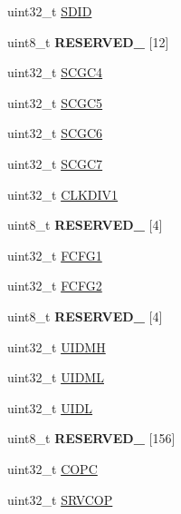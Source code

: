 \begin{DoxyCompactItemize}
\item 
uint32\+\_\+t \hyperlink{struct_s_i_m___mem_map_a05732d81c464fe278244a2027960ddc1}{S\+D\+I\+D}
\item 
\hypertarget{struct_s_i_m___mem_map_a8c752b26764b7d15368cf85fe57a34b9}{}uint8\+\_\+t {\bfseries R\+E\+S\+E\+R\+V\+E\+D\+\_} \mbox{[}12\mbox{]}\label{struct_s_i_m___mem_map_a8c752b26764b7d15368cf85fe57a34b9}

\item 
uint32\+\_\+t \hyperlink{struct_s_i_m___mem_map_a10c826c9197f80b94fa050a36943e871}{S\+C\+G\+C4}
\item 
uint32\+\_\+t \hyperlink{struct_s_i_m___mem_map_ae622490033273b25b5ba0e17600368cd}{S\+C\+G\+C5}
\item 
uint32\+\_\+t \hyperlink{struct_s_i_m___mem_map_aee7123ada2dcba294b1f26615f2cc689}{S\+C\+G\+C6}
\item 
uint32\+\_\+t \hyperlink{struct_s_i_m___mem_map_ab3ec649af457836a31a78fa8d2c4388a}{S\+C\+G\+C7}
\item 
uint32\+\_\+t \hyperlink{struct_s_i_m___mem_map_ae56d33007aecc902d1394c2adca212af}{C\+L\+K\+D\+I\+V1}
\item 
\hypertarget{struct_s_i_m___mem_map_ab95a859ed80f2b72b5538bcc1806d924}{}uint8\+\_\+t {\bfseries R\+E\+S\+E\+R\+V\+E\+D\+\_} \mbox{[}4\mbox{]}\label{struct_s_i_m___mem_map_ab95a859ed80f2b72b5538bcc1806d924}

\item 
uint32\+\_\+t \hyperlink{struct_s_i_m___mem_map_ab2a9ce086973740fcd958ea83a6967f2}{F\+C\+F\+G1}
\item 
uint32\+\_\+t \hyperlink{struct_s_i_m___mem_map_a548bbc722cef80f7bc9624f1309964c1}{F\+C\+F\+G2}
\item 
\hypertarget{struct_s_i_m___mem_map_a4e4f1fbee587e08a2b02ff956746fb74}{}uint8\+\_\+t {\bfseries R\+E\+S\+E\+R\+V\+E\+D\+\_} \mbox{[}4\mbox{]}\label{struct_s_i_m___mem_map_a4e4f1fbee587e08a2b02ff956746fb74}

\item 
uint32\+\_\+t \hyperlink{struct_s_i_m___mem_map_a599672d7e15a6f7a2b774a3b06e0e9cc}{U\+I\+D\+M\+H}
\item 
uint32\+\_\+t \hyperlink{struct_s_i_m___mem_map_ac0ca2251290fdadcaf84fbe3a7534b6d}{U\+I\+D\+M\+L}
\item 
uint32\+\_\+t \hyperlink{struct_s_i_m___mem_map_a339fceb110e65a719f4566c52270be8e}{U\+I\+D\+L}
\item 
\hypertarget{struct_s_i_m___mem_map_a2139860497710bc375266dc42d96ee6c}{}uint8\+\_\+t {\bfseries R\+E\+S\+E\+R\+V\+E\+D\+\_} \mbox{[}156\mbox{]}\label{struct_s_i_m___mem_map_a2139860497710bc375266dc42d96ee6c}

\item 
uint32\+\_\+t \hyperlink{struct_s_i_m___mem_map_a4af8557704666ca737fef4ed12200093}{C\+O\+P\+C}
\item 
uint32\+\_\+t \hyperlink{struct_s_i_m___mem_map_a4c7ae6df8582f270aeacca029b051335}{S\+R\+V\+C\+O\+P}
\end{DoxyCompactItemize}


